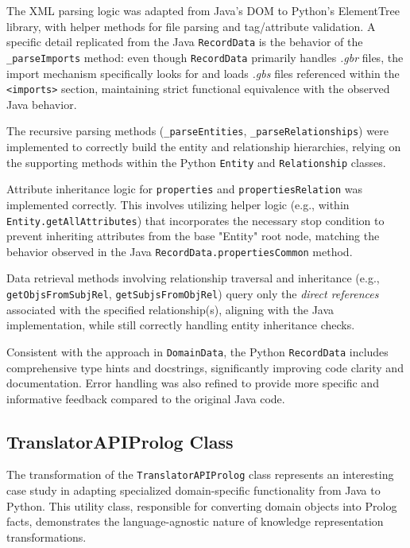 \documentclass[12pt,a4paper]{article}
\begin{document}
The XML parsing logic was adapted from Java's DOM to Python's ElementTree library, with helper methods for file parsing and tag/attribute validation. A specific detail replicated from the Java \texttt{RecordData} is the behavior of the \texttt{\_parseImports} method: even though \texttt{RecordData} primarily handles \textit{.gbr} files, the import mechanism specifically looks for and loads \textit{.gbs} files referenced within the \texttt{<imports>} section, maintaining strict functional equivalence with the observed Java behavior.

The recursive parsing methods (\texttt{\_parseEntities}, \texttt{\_parseRelationships}) were implemented to correctly build the entity and relationship hierarchies, relying on the supporting methods within the Python \texttt{Entity} and \texttt{Relationship} classes.

Attribute inheritance logic for \texttt{properties} and \texttt{propertiesRelation} was implemented correctly. This involves utilizing helper logic (e.g., within \texttt{Entity.getAllAttributes}) that incorporates the necessary stop condition to prevent inheriting attributes from the base "Entity" root node, matching the behavior observed in the Java \texttt{RecordData.propertiesCommon} method.

Data retrieval methods involving relationship traversal and inheritance (e.g., \texttt{getObjsFromSubjRel}, \texttt{getSubjsFromObjRel}) query only the \textit{direct references} associated with the specified relationship(s), aligning with the Java implementation, while still correctly handling entity inheritance checks.

Consistent with the approach in \texttt{DomainData}, the Python \texttt{RecordData} includes comprehensive type hints and docstrings, significantly improving code clarity and documentation. Error handling was also refined to provide more specific and informative feedback compared to the original Java code.

\subsection{TranslatorAPIProlog Class}

The transformation of the \texttt{TranslatorAPIProlog} class represents an interesting case study in adapting specialized domain-specific functionality from Java to Python. This utility class, responsible for converting domain objects into Prolog facts, demonstrates the language-agnostic nature of knowledge representation transformations.
\end{document}
